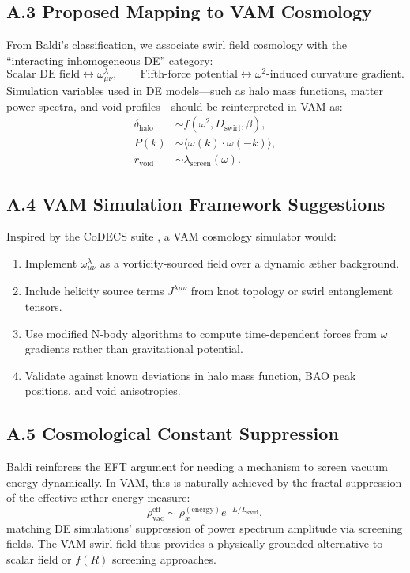 \documentclass[11pt]{article}
\begin{document}
    \subsection*{A.3 Proposed Mapping to VAM Cosmology}
    From Baldi's classification, we associate swirl field cosmology with the ``interacting inhomogeneous DE'' category:
    \[
        \text{Scalar DE field} \leftrightarrow \omega^\lambda_{\mu\nu}, \qquad \text{Fifth-force potential} \leftrightarrow \omega^2\text{-induced curvature gradient}.
    \]
    Simulation variables used in DE models—such as halo mass functions, matter power spectra, and void profiles—should be reinterpreted in VAM as:
    \begin{align*}
        \delta_{\text{halo}} &\sim f(\omega^2, D_\text{swirl}, \beta), \\
        P(k) &\sim \langle \omega(k) \cdot \omega(-k) \rangle, \\
        r_{\text{void}} &\sim \lambda_{\text{screen}}(\omega).
    \end{align*}

    \subsection*{A.4 VAM Simulation Framework Suggestions}
    Inspired by the CoDECS suite \cite{baldi2012codecs}, a VAM cosmology simulator would:
    \begin{enumerate}
        \item Implement $\omega^\lambda_{\mu\nu}$ as a vorticity-sourced field over a dynamic æther background.
        \item Include helicity source terms $J^{\lambda\mu\nu}$ from knot topology or swirl entanglement tensors.
        \item Use modified N-body algorithms to compute time-dependent forces from $\omega$ gradients rather than gravitational potential.
        \item Validate against known deviations in halo mass function, BAO peak positions, and void anisotropies.
    \end{enumerate}

    \subsection*{A.5 Cosmological Constant Suppression}
    Baldi reinforces the EFT argument for needing a mechanism to screen vacuum energy dynamically. In VAM, this is naturally achieved by the fractal suppression of the effective æther energy measure:
    \[
        \rho_{\text{vac}}^{\text{eff}} \sim \rho_\text{\ae}^{(\text{energy})} e^{-L / L_\text{swirl}},
    \]
    matching DE simulations' suppression of power spectrum amplitude via screening fields. The VAM swirl field thus provides a physically grounded alternative to scalar field or $f(R)$ screening approaches.



    
    
\end{document}

